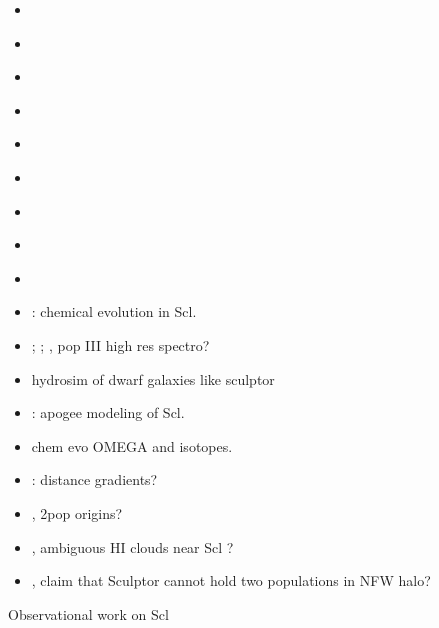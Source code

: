 \begin{itemize}
\tightlist
\item
  \citet{battaglia+2008}
\item
  \citet{iorio+2019}
\item
  \citet{amorisco+zavala+deboer2014}
\item
  \citet{breddels+2013}
\item
  \citet{breddels+helmi2013}
\item
  \citet{richardson+fairbairn2014}
\item
  \citet{SFW2017}
\item
  \citet{innanen+papp1979}
\item
  \citet{wilkinson+2002}
\item
  \citet{yang+2025}: chemical evolution in Scl.
\item
  \citet{skuladottir+2024}; \citet{skuladottir+2021};
  \citet{lee+jeon+bromm2024}, pop III high res spectro?
\item
  \citet{wang+2024a} hydrosim of dwarf galaxies like sculptor
\item
  \citet{tang+2023}: apogee modeling of Scl.
\item
  \citet{pandey+west2022} chem evo OMEGA and isotopes.
\item
  \citet{an+koposov2022}: distance gradients?
\item
  \citet{kawata+2006}, 2pop origins?
\item
  \citet{grcevich+putman2009}, \citet{carignan+1998} ambiguous HI clouds
  near Scl ?
\item
  \citet{agnello+evans2012}, claim that Sculptor cannot hold two
  populations in NFW halo?
\end{itemize}

Observational work on Scl


